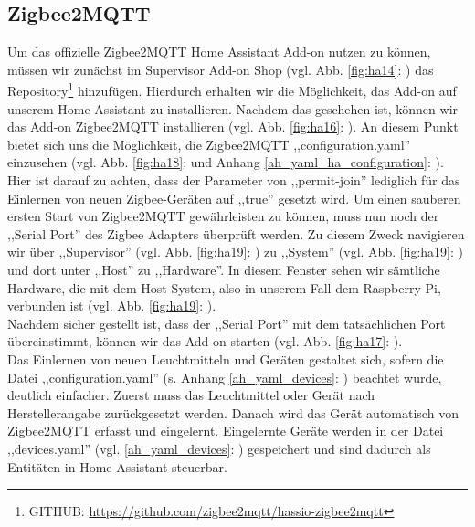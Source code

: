 \subsection{Zigbee2MQTT}
Um das offizielle Zigbee2MQTT Home Assistant Add-on nutzen zu können, müssen wir zunächst im Supervisor Add-on Shop (vgl. Abb. \ref{fig:ha14}: ) das Repository\footnote{GITHUB: \url{https://github.com/zigbee2mqtt/hassio-zigbee2mqtt}} hinzufügen. 
Hierdurch erhalten wir die Möglichkeit, das Add-on auf unserem Home Assistant zu installieren. 
Nachdem das geschehen ist, können wir das Add-on Zigbee2MQTT installieren (vgl. Abb. \ref{fig:ha16}: ). 
An diesem Punkt bietet sich uns die Möglichkeit, die Zigbee2MQTT ,,configuration.yaml'' einzusehen (vgl. Abb. \ref{fig:ha18}:  und Anhang \ref{ah_yaml_ha_configuration}: ).\\
\noindent Hier ist darauf zu achten, dass der Parameter von ,,permit-join'' lediglich für das Einlernen von neuen Zigbee-Geräten auf ,,true'' gesetzt wird.
Um einen sauberen ersten Start von Zigbee2MQTT gewährleisten zu können, muss nun noch der ,,Serial Port'' des Zigbee Adapters überprüft werden. 
Zu diesem Zweck navigieren wir über ,,Supervisor'' (vgl. Abb. \ref{fig:ha19}: ) zu ,,System'' (vgl. Abb. \ref{fig:ha19}: ) und dort unter ,,Host'' zu ,,Hardware''. 
In diesem Fenster sehen wir sämtliche Hardware, die mit dem Host-System, also in unserem Fall dem Raspberry Pi, verbunden ist (vgl. Abb. \ref{fig:ha19}: ). \\
\noindent Nachdem sicher gestellt ist, dass der ,,Serial Port'' mit dem tatsächlichen Port übereinstimmt, können wir das Add-on starten (vgl. Abb. \ref{fig:ha17}: ). \\
\noindent Das Einlernen von neuen Leuchtmitteln und Geräten gestaltet sich, sofern die Datei ,,configuration.yaml'' (s. Anhang \ref{ah_yaml_devices}: ) beachtet wurde, deutlich einfacher.
Zuerst muss das Leuchtmittel oder Gerät nach Herstellerangabe zurückgesetzt werden. 
Danach wird das Gerät automatisch von Zigbee2MQTT erfasst und eingelernt.
Eingelernte Geräte werden in der Datei ,,devices.yaml'' (vgl. \ref{ah_yaml_devices}: ) gespeichert und sind dadurch als Entitäten in Home Assistant steuerbar.
